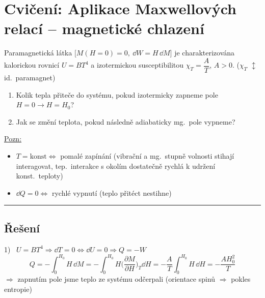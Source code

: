 \section{Cvičení: Aplikace Maxwellových relací -- magnetické chlazení}

\begin{priklad}
Paramagnetická látka $\big[M(H=0) = 0,\ \dd W = H\,\dd M\big]$ je charakterizována kalorickou rovnicí $U = BT^4$
a izotermickou susceptibilitou $\chi_T = \dfrac{A}{T}$, $A > 0$. \quad ($\chi_T$ $\updownarrow$ id.\ paramagnet)
\begin{enumerate}[label=\arabic*)]
  \item Kolik tepla přiteče do systému, pokud izotermicky zapneme pole $H = 0 \to H = H_0$?
  \item Jak se změní teplota, pokud následně adiabaticky mg.\ pole vypneme?
\end{enumerate}
\end{priklad}

\underline{Pozn:}
\begin{itemize}[nosep]
  \item $T = \text{konst} \Leftrightarrow$ pomalé zapínání (vibrační a mg.\ stupně volnosti stihají interagovat, tep.\ interakce
        s okolím dostatečně rychlá k udržení konst.\ teploty)
  \item $\dd Q = 0 \Leftrightarrow$ rychlé vypnutí (teplo přitéct nestihne)
\end{itemize}

\noindent\rule{\linewidth}{0.4pt}

\subsection*{Řešení}
{\color{NavyBlue}
1) \ $U = BT^4 \Rightarrow \dd T = 0 \Leftrightarrow \dd U = 0 \Rightarrow Q = -W$
\[
  Q = -\int_0^{H_0}H\,\dd M = -\int_0^{H_0}H\Big(\frac{\partial M}{\partial H}\Big)_T\dd H = -\frac{A}{T}\int_0^{H_0}H\,\dd H = -\frac{AH_0^2}{T}
\]
\quad $\Rightarrow$ zapnutím pole jsme teplo ze systému odčerpali (orientace spinů $\Rightarrow$ pokles entropie)
}

